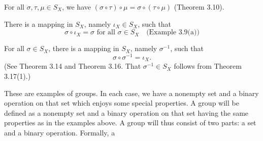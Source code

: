 \documentclass[11pt]{amsbook}
\begin{document}
\begin{exmp}
\begin{hEnumerateAlpha}
\begin{hEnumerateRoman}
			\item
			For all $\sigma , \tau , \mu \in S_{X}$, we have $(\sigma \circ \tau) \circ \mu = \sigma \circ ( \tau \circ \mu)$ (Theorem 3.10).%
			
			\item
			There is a mapping in $S_{X}$, namely $\iota_{X} \in S_{X}$, such that
			\[
				\sigma \circ \iota_{X} = \sigma \text{ for all } \sigma \in S_{X} \quad \text{(Example 3.9(a))}%
			\]
			
			\item
			For all $\sigma \in S_{X}$, there is a mapping in $S_{X}$, namely $\sigma^{-1}$, such that
			\[
				\sigma \circ \sigma^{-1} = \iota_{X}.
			\]
			(See Theorem 3.14 and Theorem 3.16. That $\sigma^{-1} \in S_{X}$ follows from Theorem 3.17(1).)%
		\end{hEnumerateRoman}
	\end{hEnumerateAlpha}
\end{exmp}

These are examples of groups. In each case, we have a nonempty set and a binary operation on that set which enjoys some special properties. A group will be defined as a nonempty set and a binary operation on that set having the same properties as in the examples above. A group will thus consist of two parts: a set and a binary operation. Formally, a



\end{document}
